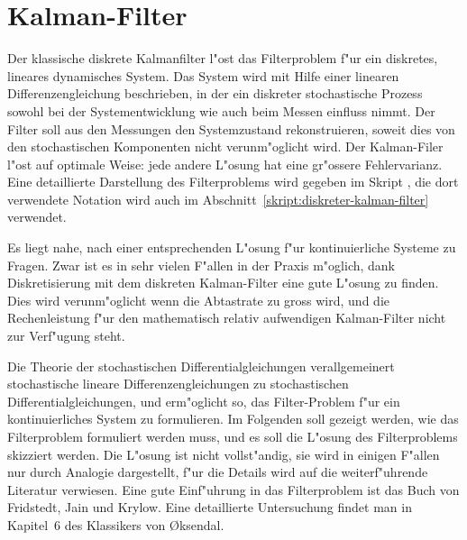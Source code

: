 %
%
\section{Kalman-Filter\label{section:kalman}}
Der klassische diskrete Kalmanfilter l"ost das Filterproblem f"ur ein
diskretes, lineares dynamisches System.
Das System wird mit Hilfe einer linearen Differenzengleichung beschrieben,
in der ein diskreter stochastische Prozess sowohl bei der Systementwicklung
wie auch beim Messen einfluss nimmt.
Der Filter soll aus den Messungen den Systemzustand rekonstruieren, soweit
dies von den stochastischen Komponenten nicht verunm"oglicht wird.
Der Kalman-Filer l"ost auf optimale Weise: jede andere L"osung hat
eine gr"ossere Fehlervarianz.
Eine detaillierte Darstellung des Filterproblems wird gegeben im
Skript \cite{skript:wrstat}, die dort verwendete Notation wird auch
im Abschnitt~\ref{skript:diskreter-kalman-filter} verwendet.

Es liegt nahe, nach einer entsprechenden L"osung f"ur kontinuierliche
Systeme zu Fragen.
Zwar ist es in sehr vielen F"allen in der Praxis m"oglich, dank
Diskretisierung mit dem diskreten Kalman-Filter eine gute L"osung
zu finden.
Dies wird verunm"oglicht wenn die Abtastrate zu gross wird, und die
Rechenleistung f"ur den mathematisch relativ aufwendigen
Kalman-Filter nicht zur Verf"ugung steht.

Die Theorie der stochastischen Differentialgleichungen verallgemeinert
stochastische lineare Differenzengleichungen zu stochastischen
Differentialgleichungen, und erm"oglicht so, das Filter-Problem f"ur
ein kontinuierliches System zu formulieren.
Im Folgenden soll gezeigt werden, wie das Filterproblem formuliert
werden muss, und es soll die L"osung des Filterproblems skizziert werden.
Die L"osung ist nicht vollst"andig, sie wird in einigen F"allen nur durch
Analogie dargestellt, f"ur die Details wird auf die weiterf"uhrende
Literatur verwiesen.
Eine gute Einf"uhrung in das Filterproblem ist das Buch \cite{skript:filter}
von Fridstedt, Jain und Krylow.
Eine detaillierte Untersuchung findet man in Kapitel~6 des Klassikers
\cite{skript:oksendal} von \O{}ksendal.

%
%
